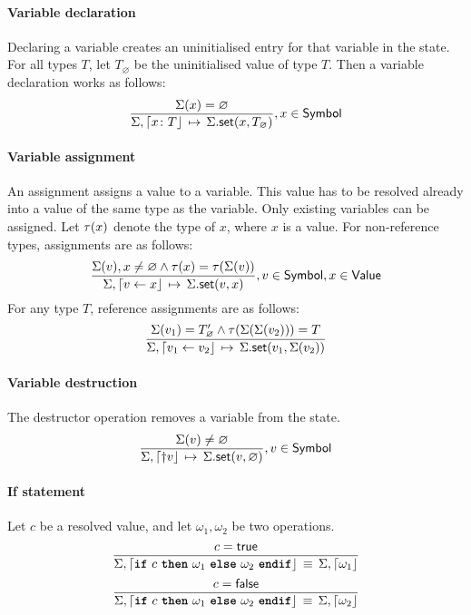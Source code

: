 \paragraph{Variable declaration}
Declaring a variable creates an uninitialised entry for that variable in the state.
For all types $T$, let $T_\varnothing$ be the uninitialised value of type $T$.
Then a variable declaration works as follows:
$$
\semrule
	{\Sigma(x) = \varnothing}
	{\Sigma, \stmt{\varv{x}{T}}}
	{\StSet{\Sigma}{x}{T_\varnothing}},
		x \in \Symbol
$$

\paragraph{Variable assignment}
An assignment assigns a value to a variable.
This value has to be resolved already into a value of the same type as the variable.
Only existing variables can be assigned.
Let $\tau(x)$ denote the type of $x$, where $x$ is a value.
For non-reference types, assignments are as follows:
$$
\semrule
	{\Sigma(v), x \neq \varnothing \land
		\typeof{x} = \typeof{\Sigma(v)}}
	{\Sigma, \stmt{v \gets x}}
	{\StSet{\Sigma}{v}{x}},
		v \in \Symbol,
		x \in \Value
$$
For any type $T$, reference assignments are as follows:
$$
\semrule
	{\Sigma(v_1) = \reft{T}_\varnothing \land
		\typeof{\Sigma(\Sigma(v_2))} = T}
	{\Sigma, \stmt{v_1 \gets v_2}}
	{\StSet{\Sigma}{v_1}{\Sigma(v_2)}}
$$

\paragraph{Variable destruction}
The destructor operation removes a variable from the state.
$$
\semrule
	{\Sigma(v) \neq \varnothing}
	{\Sigma, \stmt{\dagger v}}
	{\StSet{\Sigma}{v}{\varnothing}},
		v \in \Symbol
$$


\paragraph{If statement}
Let $c$ be a resolved value, and let $\omega_1, \omega_2$ be two operations.
$$
\semruleeq
	{c = \true}
	{\Sigma, \stmt{\ifstmt{c}{\omega_1}{\omega_2}}}
	{\Sigma, \stmt{\omega_1}}
$$
$$
\semruleeq
	{c = \false}
	{\Sigma, \stmt{\ifstmt{c}{\omega_1}{\omega_2}}}
	{\Sigma, \stmt{\omega_2}}
$$